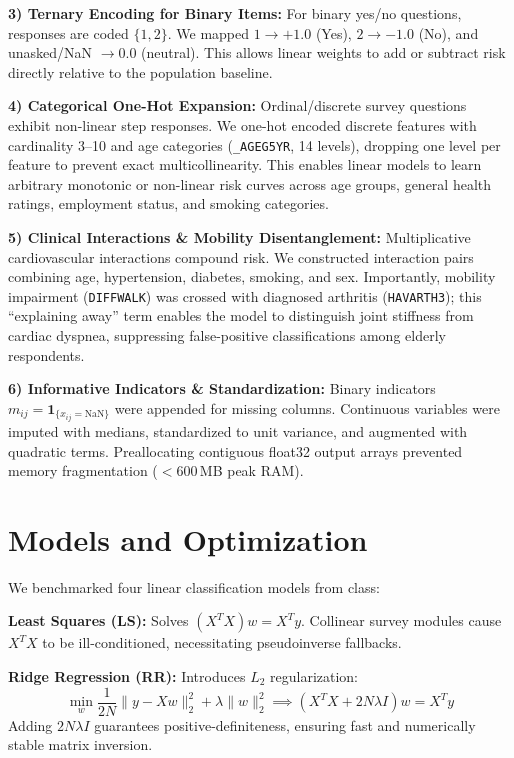 \documentclass[10pt,conference,compsocconf]{IEEEtran}
\begin{document}
\textbf{3) Ternary Encoding for Binary Items:} For binary yes/no questions, responses are coded $\{1, 2\}$. We mapped $1 \to +1.0$ (Yes), $2 \to -1.0$ (No), and unasked/NaN $\to 0.0$ (neutral). This allows linear weights to add or subtract risk directly relative to the population baseline.

\textbf{4) Categorical One-Hot Expansion:} Ordinal/discrete survey questions exhibit non-linear step responses. We one-hot encoded discrete features with cardinality 3--10 and age categories (\texttt{\_AGEG5YR}, 14 levels), dropping one level per feature to prevent exact multicollinearity. This enables linear models to learn arbitrary monotonic or non-linear risk curves across age groups, general health ratings, employment status, and smoking categories.

\textbf{5) Clinical Interactions \& Mobility Disentanglement:} Multiplicative cardiovascular interactions compound risk. We constructed interaction pairs combining age, hypertension, diabetes, smoking, and sex. Importantly, mobility impairment (\texttt{DIFFWALK}) was crossed with diagnosed arthritis (\texttt{HAVARTH3}); this ``explaining away'' term enables the model to distinguish joint stiffness from cardiac dyspnea, suppressing false-positive classifications among elderly respondents.

\textbf{6) Informative Indicators \& Standardization:} Binary indicators $m_{ij} = \mathbf{1}_{\{x_{ij} = \text{NaN}\}}$ were appended for missing columns. Continuous variables were imputed with medians, standardized to unit variance, and augmented with quadratic terms. Preallocating contiguous float32 output arrays prevented memory fragmentation ($<600$\,MB peak RAM).

\section{Models and Optimization}
\label{sec:methods}

We benchmarked four linear classification models from class:

\textbf{Least Squares (LS):} Solves $(X^T X) w = X^T y$. Collinear survey modules cause $X^T X$ to be ill-conditioned, necessitating pseudoinverse fallbacks.

\textbf{Ridge Regression (RR):} Introduces $L_2$ regularization:
\begin{equation}
\min_w \frac{1}{2N} \|y - X w\|_2^2 + \lambda \|w\|_2^2 \implies (X^T X + 2 N \lambda I) w = X^T y
\end{equation}
Adding $2 N \lambda I$ guarantees positive-definiteness, ensuring fast and numerically stable matrix inversion.
\end{document}
